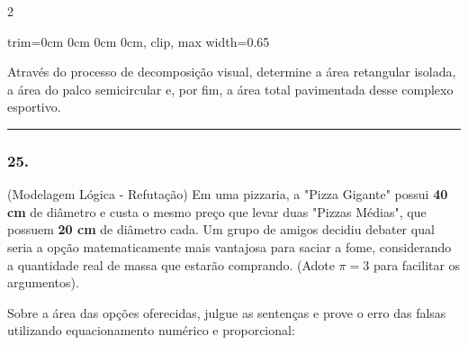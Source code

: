 \documentclass[twoside, 10pt, a4paper]{article}
\newlength{\espacoPreQuestao}\setlength{\espacoPreQuestao}{0.1cm}
\newlength{\espacoQuestao}\setlength{\espacoQuestao}{0.2cm}
\begin{document}
\begin{multicols*}{2}
\begin{center}
\begin{adjustbox}{trim=0cm 0cm 0cm 0cm, clip, max width=0.65\linewidth}
\end{adjustbox}
\end{center}

Através do processo de decomposição visual, determine a área retangular isolada, a área do palco semicircular e, por fim, a área total pavimentada desse complexo esportivo.
\par\vspace{\espacoQuestao}

\noindent\textcolor{CorLinha}{\rule{\linewidth}{0.5pt}} 
\par\vspace{\espacoPreQuestao}
\subsubsection*{25.} (Modelagem Lógica - Refutação) Em uma pizzaria, a "Pizza Gigante" possui \textbf{40 cm} de diâmetro e custa o mesmo preço que levar duas "Pizzas Médias", que possuem \textbf{20 cm} de diâmetro cada. Um grupo de amigos decidiu debater qual seria a opção matematicamente mais vantajosa para saciar a fome, considerando a quantidade real de massa que estarão comprando. (Adote $ \pi = 3 $ para facilitar os argumentos).

Sobre a área das opções oferecidas, julgue as sentenças e prove o erro das falsas utilizando equacionamento numérico e proporcional:


\end{multicols*}
\end{document}
